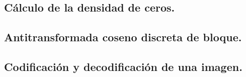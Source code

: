 \documentclass[%
	final,
	reprint,
	notitlepage,
	narroweqnarray,
	inline,
	twoside,
	invited
	]{ieee}
\begin{document}

\subsection{Cálculo de la densidad de ceros. }


\subsection{Antitransformada coseno discreta de bloque. }


\subsection{Codificación y decodificación de una imagen.}

\end{document}
